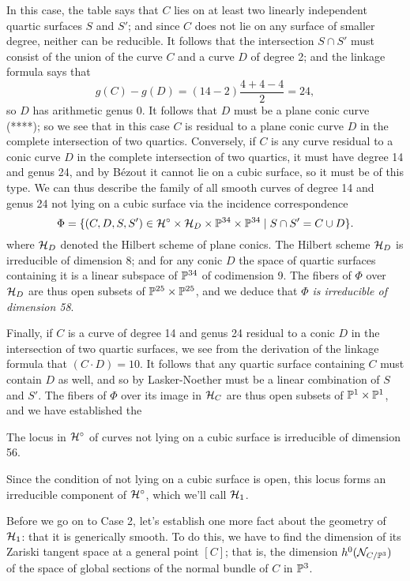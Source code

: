 In this case, the table says that $C$ lies on at least two linearly independent quartic surfaces $S$ and $S'$; and since $C$ does not lie on any surface of smaller degree, neither can be reducible. It follows that the intersection $S \cap S'$ must consist of the union of the curve $C$ and a curve $D$ of degree 2; and the linkage formula says that
$$
g(C) - g(D) = (14 - 2)\frac{4+4-4}{2} = 24,
$$
so $D$ has arithmetic genus 0. It follows that $D$ must be a plane conic curve (****); so we see that in this case $C$ is residual to a plane conic curve $D$ in the complete intersection of two quartics. Conversely, if $C$ is any curve residual to a conic curve $D$ in the complete intersection of two quartics, it must have degree 14 and genus 24, and by B\'ezout it cannot lie on a cubic surface, so it must be of this type. We can thus describe the family of all smooth curves of degree 14 and genus 24 not lying on a cubic surface via the incidence correspondence
$$
\Phi = \{ (C, D, S, S') \in {\cal H}^\circ \times {\cal H}_D \times {\mathbb P}^{34} \times {\mathbb P}^{34} \mid S \cap S' = C \cup D\}.
$$
where ${\cal H}_D$ denoted the Hilbert scheme of plane conics. The Hilbert scheme ${\cal H}_D$ is irreducible of dimension 8; and for any conic $D$ the space of quartic surfaces containing it is a linear subspace of ${\mathbb P}^{34}$ of codimension 9. The fibers of $\Phi$ over ${\cal H}_D$ are thus open subsets of ${\mathbb P}^{25} \times {\mathbb P}^{25}$, and we deduce that \emph{$\Phi$ is irreducible of dimension 58}. 

Finally, if $C$ is a curve of degree 14 and genus 24 residual to a conic $D$ in the intersection of two quartic surfaces, we see from the derivation of the linkage formula that $(C\cdot D) = 10$. It follows that any quartic surface containing $C$ must contain $D$ as well, and so by Lasker-Noether must be a linear combination of $S$ and $S'$. The fibers of $\Phi$ over its image in ${\cal H}_C$ are thus open subsets of ${\mathbb P}^1 \times {\mathbb P}^1$, and we have established the

\begin{proposition}
The locus in ${\cal H}^\circ$ of curves not lying on a cubic surface is irreducible of dimension 56.
\end{proposition} 

Since the condition of not lying on a cubic surface is open, this locus forms an irreducible component of ${\cal H}^\circ$, which we'll call ${\cal H}_1$.

Before we go on to Case 2, let's establish one more fact about the geometry of ${\cal H}_1$: that it is generically smooth. To do this, we have to find the dimension of its Zariski tangent space at a general point $[C]$; that is, the dimension $h^0({\mathcal N}_{C/{\mathbb P}^3})$ of the space of global sections of the normal bundle of $C$ in ${\mathbb P}^3$.

